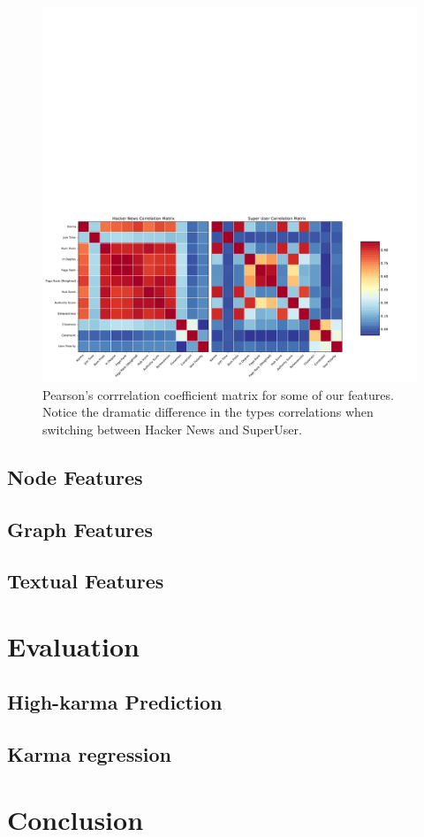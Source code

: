 \documentclass[11pt]{article}
\begin{document}
\begin{figure}[t]
\centering
\includegraphics[width=\linewidth]{correlation}
\caption{Pearson's corrrelation coefficient matrix for some of our features.
Notice the dramatic difference in the types correlations when switching
between Hacker News and SuperUser.}
\label{fig:correlation}
\end{figure}

\subsection{Node Features}

\subsection{Graph Features}


\subsection{Textual Features}


\section{Evaluation}

\subsection{High-karma Prediction}

\subsection{Karma regression}

\section{Conclusion}

{} 
\end{document}
